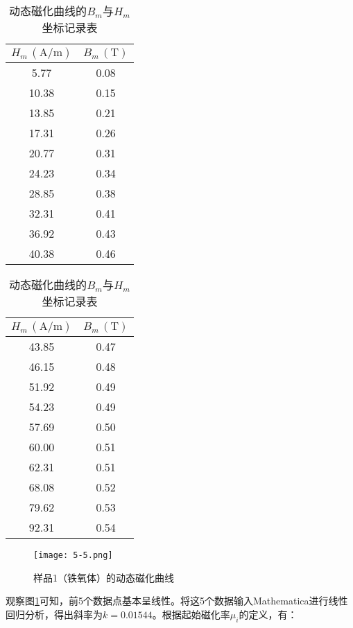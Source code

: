 \documentclass[12pt]{article}
\begin{document}
\begin{table}[htbp]
    \centering
      \begin{tabular}{|c|c|}
      \hline
      $H_m\,(\mathrm{A/m})$ & $B_m\,(\mathrm{T})$ \\
      \hline
      5.77  & 0.08  \\
      \hline
      10.38  & 0.15  \\
      \hline
      13.85  & 0.21  \\
      \hline
      17.31  & 0.26  \\
      \hline
      20.77  & 0.31  \\
      \hline
      24.23  & 0.34  \\
      \hline
      28.85  & 0.38  \\
      \hline
      32.31  & 0.41  \\
      \hline
      36.92  & 0.43  \\
      \hline
      40.38  & 0.46  \\
      \hline
    \end{tabular}%
    \quad
    \begin{tabular}{|c|c|}
    \hline
    $H_m\,(\mathrm{A/m})$ & $B_m\,(\mathrm{T})$ \\
    \hline
    43.85  & 0.47  \\
    \hline
    46.15  & 0.48  \\
    \hline
    51.92  & 0.49  \\
    \hline
    54.23  & 0.49  \\
    \hline
    57.69  & 0.50  \\
    \hline
    60.00  & 0.51  \\
    \hline
    62.31  & 0.51  \\
    \hline
    68.08  & 0.52  \\
    \hline
    79.62  & 0.53  \\
    \hline
    92.31  & 0.54  \\
    \hline
    \end{tabular}%
    \caption{动态磁化曲线的$B_m$与$H_m$坐标记录表}
  \end{table}%

\begin{figure}[htbp]
    \centering
    \texttt{[image: 5-5.png]}
    \caption{样品1（铁氧体）的动态磁化曲线}
    \label{fig:4}
\end{figure}

观察图\ref{fig:4}可知，前5个数据点基本呈线性。将这5个数据输入Mathematica进行线性回归分析，得出斜率为$k=0.01544$。根据起始磁化率$\mu_i$的定义，有：
\end{document}
